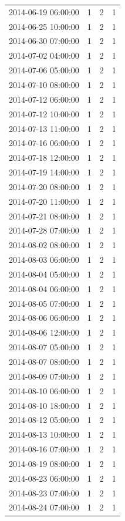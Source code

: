 \begin{tabular}{lrrr}
2014-06-19 06:00:00 & 1 & 2 & 1 \\
2014-06-25 10:00:00 & 1 & 2 & 1 \\
2014-06-30 07:00:00 & 1 & 2 & 1 \\
2014-07-02 04:00:00 & 1 & 2 & 1 \\
2014-07-06 05:00:00 & 1 & 2 & 1 \\
2014-07-10 08:00:00 & 1 & 2 & 1 \\
2014-07-12 06:00:00 & 1 & 2 & 1 \\
2014-07-12 10:00:00 & 1 & 2 & 1 \\
2014-07-13 11:00:00 & 1 & 2 & 1 \\
2014-07-16 06:00:00 & 1 & 2 & 1 \\
2014-07-18 12:00:00 & 1 & 2 & 1 \\
2014-07-19 14:00:00 & 1 & 2 & 1 \\
2014-07-20 08:00:00 & 1 & 2 & 1 \\
2014-07-20 11:00:00 & 1 & 2 & 1 \\
2014-07-21 08:00:00 & 1 & 2 & 1 \\
2014-07-28 07:00:00 & 1 & 2 & 1 \\
2014-08-02 08:00:00 & 1 & 2 & 1 \\
2014-08-03 06:00:00 & 1 & 2 & 1 \\
2014-08-04 05:00:00 & 1 & 2 & 1 \\
2014-08-04 06:00:00 & 1 & 2 & 1 \\
2014-08-05 07:00:00 & 1 & 2 & 1 \\
2014-08-06 06:00:00 & 1 & 2 & 1 \\
2014-08-06 12:00:00 & 1 & 2 & 1 \\
2014-08-07 05:00:00 & 1 & 2 & 1 \\
2014-08-07 08:00:00 & 1 & 2 & 1 \\
2014-08-09 07:00:00 & 1 & 2 & 1 \\
2014-08-10 06:00:00 & 1 & 2 & 1 \\
2014-08-10 18:00:00 & 1 & 2 & 1 \\
2014-08-12 05:00:00 & 1 & 2 & 1 \\
2014-08-13 10:00:00 & 1 & 2 & 1 \\
2014-08-16 07:00:00 & 1 & 2 & 1 \\
2014-08-19 08:00:00 & 1 & 2 & 1 \\
2014-08-23 06:00:00 & 1 & 2 & 1 \\
2014-08-23 07:00:00 & 1 & 2 & 1 \\
2014-08-24 07:00:00 & 1 & 2 & 1 \\

\end{tabular}
